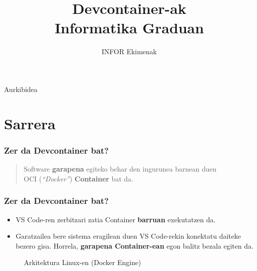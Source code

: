 \documentclass[lang=eu,biz=foe,aspectratio=169,handout]{mupresentation}
\title{Devcontainer-ak\\Informatika Graduan}
\subtitle{INFOR Ekimenak}
\institute{Mondragon Unibertsitatea}
\date{}
\begin{document}
\mucover

\setcounter{tocdepth}{1}
\begin{frame}{Aurkibidea}
  \tableofcontents
\end{frame}

\section{Sarrera}

\begin{frame}
  \frametitle{Zer da Devcontainer bat?}
  \begin{quote}
    Software \textbf{garapena} egiteko behar den ingurunea barnean duen\\ OCI (\textit{``Docker''}) \textbf{Container} bat da.
  \end{quote}
\end{frame}

\begin{frame}
  \frametitle{Zer da Devcontainer bat?}
  \begin{itemize}
    \item VS Code-ren zerbitzari zatia Container \textbf{barruan} exekutatzen da.
    \item Garatzailea bere sistema eragilean duen VS Code-rekin konektatu daiteke bezero gisa. Horrela, \textbf{garapena Container-ean} egon balitz bezala egiten da.
  \end{itemize}
  \begin{figure}[ht]
    \centering
    \caption{Arkitektura Linux-en (Docker Engine)}
    \label{fig:devcontainer_linux}
  \end{figure}
\end{frame}
\end{document}
